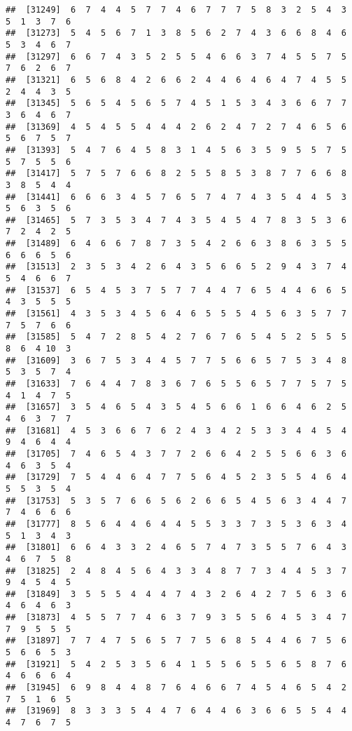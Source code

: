 \documentclass[
]{book}
\begin{document}
\begin{verbatim}
##  [31249]  6  7  4  4  5  7  7  4  6  7  7  7  5  8  3  2  5  4  3  5  1  3  7  6
##  [31273]  5  4  5  6  7  1  3  8  5  6  2  7  4  3  6  6  8  4  6  5  3  4  6  7
##  [31297]  6  6  7  4  3  5  2  5  5  4  6  6  3  7  4  5  5  7  5  7  6  2  6  7
##  [31321]  6  5  6  8  4  2  6  6  2  4  4  6  4  6  4  7  4  5  5  2  4  4  3  5
##  [31345]  5  6  5  4  5  6  5  7  4  5  1  5  3  4  3  6  6  7  7  3  6  4  6  7
##  [31369]  4  5  4  5  5  4  4  4  2  6  2  4  7  2  7  4  6  5  6  5  6  7  5  7
##  [31393]  5  4  7  6  4  5  8  3  1  4  5  6  3  5  9  5  5  7  5  5  7  5  5  6
##  [31417]  5  7  5  7  6  6  8  2  5  5  8  5  3  8  7  7  6  6  8  3  8  5  4  4
##  [31441]  6  6  6  3  4  5  7  6  5  7  4  7  4  3  5  4  4  5  3  5  6  3  5  6
##  [31465]  5  7  3  5  3  4  7  4  3  5  4  5  4  7  8  3  5  3  6  7  2  4  2  5
##  [31489]  6  4  6  6  7  8  7  3  5  4  2  6  6  3  8  6  3  5  5  6  6  6  5  6
##  [31513]  2  3  5  3  4  2  6  4  3  5  6  6  5  2  9  4  3  7  4  5  4  6  6  7
##  [31537]  6  5  4  5  3  7  5  7  7  4  4  7  6  5  4  4  6  6  5  4  3  5  5  5
##  [31561]  4  3  5  3  4  5  6  4  6  5  5  5  4  5  6  3  5  7  7  7  5  7  6  6
##  [31585]  5  4  7  2  8  5  4  2  7  6  7  6  5  4  5  2  5  5  5  8  6  4 10  3
##  [31609]  3  6  7  5  3  4  4  5  7  7  5  6  6  5  7  5  3  4  8  5  3  5  7  4
##  [31633]  7  6  4  4  7  8  3  6  7  6  5  5  6  5  7  7  5  7  5  4  1  4  7  5
##  [31657]  3  5  4  6  5  4  3  5  4  5  6  6  1  6  6  4  6  2  5  4  6  3  7  7
##  [31681]  4  5  3  6  6  7  6  2  4  3  4  2  5  3  3  4  4  5  4  9  4  6  4  4
##  [31705]  7  4  6  5  4  3  7  7  2  6  6  4  2  5  5  6  6  3  6  4  6  3  5  4
##  [31729]  7  5  4  4  6  4  7  7  5  6  4  5  2  3  5  5  4  6  4  5  5  3  5  4
##  [31753]  5  3  5  7  6  6  5  6  2  6  6  5  4  5  6  3  4  4  7  7  4  6  6  6
##  [31777]  8  5  6  4  4  6  4  4  5  5  3  3  7  3  5  3  6  3  4  5  1  3  4  3
##  [31801]  6  6  4  3  3  2  4  6  5  7  4  7  3  5  5  7  6  4  3  4  6  7  5  8
##  [31825]  2  4  8  4  5  6  4  3  3  4  8  7  7  3  4  4  5  3  7  9  4  5  4  5
##  [31849]  3  5  5  5  4  4  4  7  4  3  2  6  4  2  7  5  6  3  6  4  6  4  6  3
##  [31873]  4  5  5  7  7  4  6  3  7  9  3  5  5  6  4  5  3  4  7  7  9  5  5  5
##  [31897]  7  7  4  7  5  6  5  7  7  5  6  8  5  4  4  6  7  5  6  5  6  6  5  3
##  [31921]  5  4  2  5  3  5  6  4  1  5  5  6  5  5  6  5  8  7  6  4  6  6  6  4
##  [31945]  6  9  8  4  4  8  7  6  4  6  6  7  4  5  4  6  5  4  2  7  5  1  6  5
##  [31969]  8  3  3  3  5  4  4  7  6  4  4  6  3  6  6  5  5  4  4  4  7  6  7  5

\end{verbatim}
\end{document}
